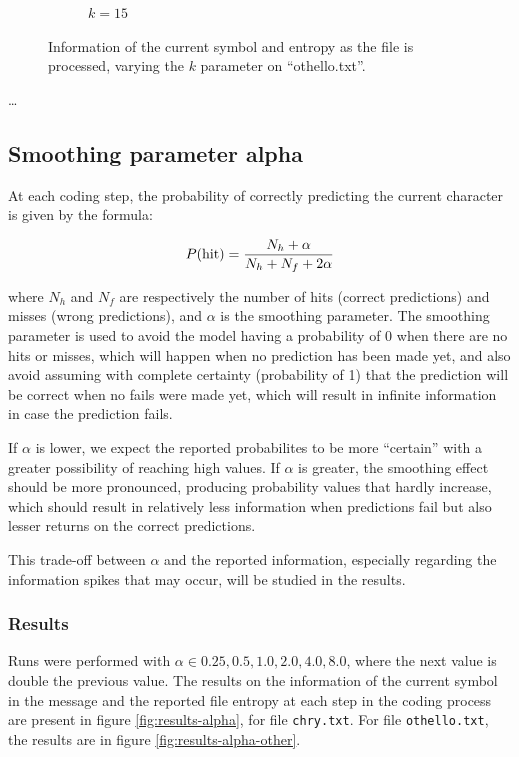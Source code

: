 \documentclass{article}
\begin{document}
\begin{figure}
\begin{subfigure}[b]{0.3\textwidth}
\begin{center}
        \end{center}
        \caption{$k = 15$}
        \label{fig:results-pattern-size-other-15}
    \end{subfigure}
    \caption{Information of the current symbol and entropy as the file is processed, varying the $k$ parameter on ``othello.txt''.}
    \label{fig:results-pattern-size-other}
\end{figure}



\dots

\subsection{Smoothing parameter alpha}

At each coding step, the probability of correctly predicting the current character is given by the formula:

$$
P(\textnormal{hit}) = \frac{N_h + \alpha}{N_h + N_f + 2\alpha}
$$

where $N_h$ and $N_f$ are respectively the number of hits (correct predictions) and misses (wrong predictions), and $\alpha$ is the smoothing parameter.
The smoothing parameter is used to avoid the model having a probability of 0 when there are no hits or misses, which will happen when no prediction has been made yet, and also avoid assuming with complete certainty (probability of 1) that the prediction will be correct when no fails were made yet, which will result in infinite information in case the prediction fails.

If $\alpha$ is lower, we expect the reported probabilites to be more ``certain'' with a greater possibility of reaching high values.
If $\alpha$ is greater, the smoothing effect should be more pronounced, producing probability values that hardly increase, which should result in relatively less information when predictions fail but also lesser returns on the correct predictions.

This trade-off between $\alpha$ and the reported information, especially regarding the information spikes that may occur, will be studied in the results.

\subsubsection{Results}

Runs were performed with $\alpha \in {0.25, 0.5, 1.0, 2.0, 4.0, 8.0}$, where the next value is double the previous value.
The results on the information of the current symbol in the message and the reported file entropy at each step in the coding process are
present in figure \ref{fig:results-alpha}, for file \verb|chry.txt|.
For file \verb|othello.txt|, the results are in figure \ref{fig:results-alpha-other}.
\end{document}
